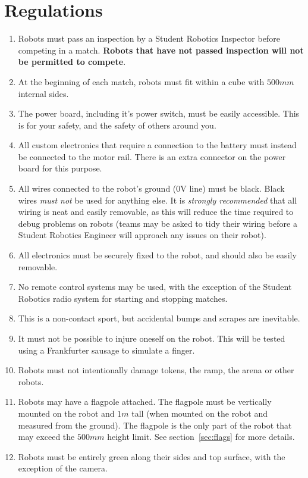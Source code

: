 \section {Regulations}
\label{regs}

\begin{enumerate}
\item Robots must pass an inspection by a Student Robotics Inspector before competing in a match.
 \textbf{Robots that have not passed inspection will not be permitted to compete}.
\item At the beginning of each match, robots must fit within a cube with $500mm$ internal sides.
\item The power board, including it's power switch, must be easily accessible.
 This is for your safety, and the safety of others around you.
\item All custom electronics that require a connection to the battery must instead be connected to the motor rail.
 There is an extra connector on the power board for this purpose.
\item All wires connected to the robot's ground (0V line) must be black.
 Black wires \emph{must not} be used for anything else.
 It is \emph{strongly recommended} that all wiring is neat and easily removable, as this will reduce the time required to debug problems on robots (teams may be asked to tidy their wiring before a Student Robotics Engineer will approach any issues on their robot).
\item All electronics must be securely fixed to the robot, and should also be easily removable.
\item No remote control systems may be used, with the exception of the Student Robotics radio system for starting and stopping matches.
\item This is a non-contact sport, but accidental bumps and scrapes are inevitable.
\item It must not be possible to injure oneself on the robot.
 This will be tested using a Frankfurter sausage to simulate a finger.
\item Robots must not intentionally damage tokens, the ramp, the arena or other robots.
\item Robots may have a flagpole attached.
 The flagpole must be vertically mounted on the robot and $1m$ tall (when mounted on the robot and measured from the ground).
 The flagpole is the only part of the robot that may exceed the $500mm$ height limit.
 See section~\ref{sec:flags} for more details.
\item Robots must be entirely green along their sides and top surface, with the exception of the camera.

\end{enumerate}
